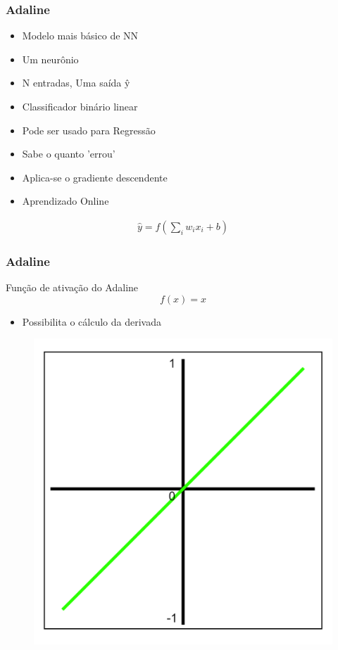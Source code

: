 \documentclass{beamer}
\begin{document}
\begin{frame}
	\frametitle{Adaline}
	\begin{itemize}
		\item Modelo mais básico de NN
		\item Um neurônio
		\item N entradas, Uma saída ŷ
		\item Classificador binário linear
		\item Pode ser usado para Regressão
		\item Sabe o quanto 'errou'
		\item Aplica-se o gradiente descendente
		\item Aprendizado Online
	\end{itemize}
	
	\begin{gather*}
		\hat{y} = f( \sum_i w_i x_i + b)
	\end{gather*}
\end{frame}
\begin{frame}
	\frametitle{Adaline}
	\begin{block}{Função de ativação do Adaline}
		$$f(x) = x$$
		\begin{itemize}
			\item Possibilita o cálculo da derivada
		\end{itemize}
	\end{block}
	
	\begin{figure}
		\centering
		\includegraphics[width=0.35\linewidth]{figures/linear_function}
	\end{figure}

\end{frame}
\end{document}
